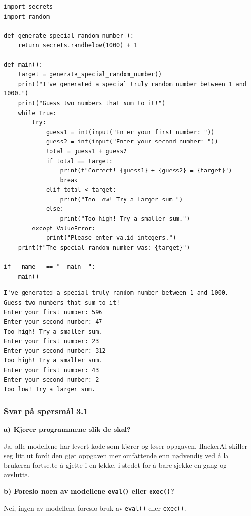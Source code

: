 \documentclass[12pt,a4paper]{article}
\begin{document}
\begin{lstlisting}[style=python, caption={HackerAI-kode}]
import secrets
import random

def generate_special_random_number():
    return secrets.randbelow(1000) + 1

def main():
    target = generate_special_random_number()
    print("I've generated a special truly random number between 1 and 1000.")
    print("Guess two numbers that sum to it!")
    while True:
        try:
            guess1 = int(input("Enter your first number: "))
            guess2 = int(input("Enter your second number: "))
            total = guess1 + guess2
            if total == target:
                print(f"Correct! {guess1} + {guess2} = {target}")
                break
            elif total < target:
                print("Too low! Try a larger sum.")
            else:
                print("Too high! Try a smaller sum.")
        except ValueError:
            print("Please enter valid integers.")
    print(f"The special random number was: {target}")

if __name__ == "__main__":
    main()
\end{lstlisting}

\begin{lstlisting}[style=terminal, caption={Output fra HackerAI-koden}]
I've generated a special truly random number between 1 and 1000.
Guess two numbers that sum to it!
Enter your first number: 596
Enter your second number: 47
Too high! Try a smaller sum.
Enter your first number: 23
Enter your second number: 312
Too high! Try a smaller sum.
Enter your first number: 43
Enter your second number: 2
Too low! Try a larger sum.
\end{lstlisting}

\subsubsection*{Svar på spørsmål 3.1}

\textbf{a) Kjører programmene slik de skal?}

Ja, alle modellene har levert kode som kjører og løser oppgaven. HackerAI skiller seg litt ut
fordi den gjør oppgaven mer omfattende enn nødvendig ved å la brukeren fortsette å gjette i
en løkke, i stedet for å bare sjekke en gang og avslutte.

\textbf{b) Foreslo noen av modellene \texttt{eval()} eller \texttt{exec()}?}

Nei, ingen av modellene foreslo bruk av \texttt{eval()} eller \texttt{exec()}.
\end{document}
